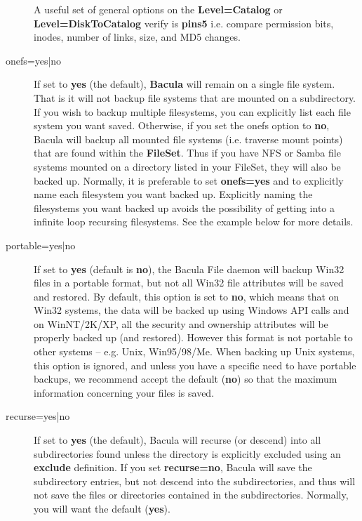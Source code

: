 \begin{description}
   A useful set of general options on the {\bf Level=Catalog}  or {\bf
   Level=DiskToCatalog}  verify is {\bf pins5} i.e. compare permission bits,
   inodes, number  of links, size, and MD5 changes. 

\item [onefs=yes|no]
   If set to {\bf yes} (the default), {\bf Bacula}  will remain on a single file
   system. That is it will not backup  file systems that are mounted on a
   subdirectory.  If you wish to backup multiple filesystems, you can  explicitly
   list each file system you want saved.  Otherwise, if you set the onefs option
   to {\bf no}, Bacula will backup  all mounted file systems (i.e. traverse mount
   points) that  are found within the {\bf FileSet}. Thus if  you have NFS or
   Samba file systems mounted on a directory listed  in your FileSet, they will
   also be backed up. Normally, it is  preferable to set {\bf onefs=yes} and to
   explicitly name  each filesystem you want backed up. Explicitly naming  the
   filesystems you want backed up avoids the possibility  of getting into a
   infinite loop recursing filesystems.  See the example below for more details. 

\label{portable}

\item [portable=yes|no]
   If set to {\bf yes} (default is  {\bf no}), the Bacula File daemon will backup
   Win32 files  in a portable format, but not all Win32 file attributes  will be
   saved and restored. By default, this option is set to  {\bf no}, which means
   that on Win32 systems, the data will  be backed up using Windows API calls and
   on WinNT/2K/XP,  all the security and ownership attributes will be properly
   backed up  (and restored). However this format is not portable to other 
   systems -- e.g. Unix, Win95/98/Me. When backing up Unix systems, this  option
   is ignored, and unless you have a specific need to  have portable backups, we
   recommend accept the default  ({\bf no}) so that the maximum information
   concerning  your files is saved. 

\item [recurse=yes|no]
   If set to {\bf yes} (the default),  Bacula will recurse (or descend) into all
   subdirectories  found unless the directory is explicitly excluded  using an
   {\bf exclude} definition.  If you set {\bf recurse=no}, Bacula will save the 
   subdirectory entries, but not descend into the  subdirectories, and thus will
   not save the files or  directories contained in the subdirectories. Normally,
   you  will want the default ({\bf yes}). 


\end{description}

